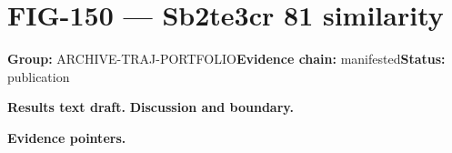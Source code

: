\clearpage
\section{FIG-150 --- Sb2te3cr 81 similarity}
\label{figpage:fig-150}
\textbf{Group:} ARCHIVE-TRAJ-PORTFOLIO\quad \textbf{Evidence chain:} manifested\quad \textbf{Status:} publication

\textbf{Results text draft.} 
\textbf{Discussion and boundary.} 


\textbf{Evidence pointers.}



\vfill
